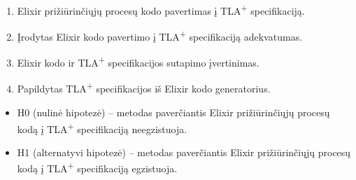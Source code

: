 \documentclass{VUMIFPSmagistrinis}
\begin{document}
		\begin{enumerate}
			\item{Elixir prižiūrinčiųjų procesų kodo pavertimas į TLA\textsuperscript{+} specifikaciją.}
			\item{Įrodytas Elixir kodo pavertimo į TLA\textsuperscript{+} specifikaciją adekvatumas.}
			\item{Elixir kodo ir TLA\textsuperscript{+} specifikacijos sutapimo įvertinimas.}
			\item{Papildytas TLA\textsuperscript{+} specifikacijos iš Elixir kodo generatorius.}
		\end{enumerate}

		\begin{itemize}
			\item H0 (nulinė hipotezė) -- metodas paverčiantis Elixir prižiūrinčiųjų procesų kodą į TLA\textsuperscript{+} specifikaciją neegzistuoja.
			\item H1 (alternatyvi hipotezė) -- metodas paverčiantis Elixir prižiūrinčiųjų procesų kodą į TLA\textsuperscript{+} specifikaciją egzistuoja.
		\end{itemize}
		
	\pagebreak
	\printbibliography[heading=bibintoc] 
\end{document}

